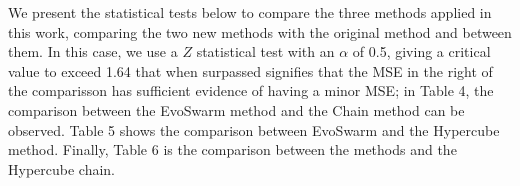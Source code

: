 \documentclass[runningheads]{llncs}
\begin{document}
\begin{table}[h!tb]
{\begin{tabular}{|c|c||c|c|c||c|c|c|}
    \hline
    \end{tabular}}
    \label{tab:my_label}
\end{table}
\hfill\break


We present the statistical tests below to compare the three methods
applied in this work, comparing the two new methods with the original
method and between them. In this case, we use a \(Z\) statistical test
with an $\alpha$ of 0.5, giving a critical value to exceed 1.64 that 
when surpassed signifies that the MSE in the right of the comparisson 
has sufficient evidence of having a minor MSE; %
in Table 4, the comparison between the EvoSwarm method and the Chain
method can be observed. Table 5 shows the comparison between EvoSwarm
and the Hypercube method. Finally, Table 6 is the comparison between
the methods and the Hypercube chain.\hfill \break
\end{document}
